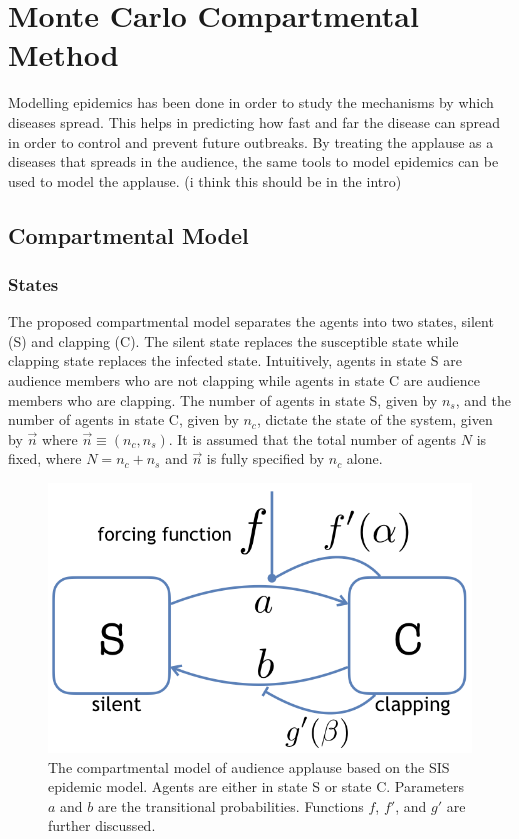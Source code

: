 \chapter{Monte Carlo Compartmental Method}
\label{chap2}

\hspace{\parindent} Modelling epidemics has been done in order to study the mechanisms by which diseases spread. This helps in predicting how fast and far the disease can spread in order to control and prevent future outbreaks. By treating the applause as a diseases that spreads in the audience, the same tools to model epidemics can be used to model the applause. (i think this should be in the intro)

\section{Compartmental Model}
\subsection{States}

The proposed compartmental model separates the agents into two states, silent (S) and clapping (C). The silent state replaces the susceptible state while clapping state replaces the infected state. 
Intuitively, agents in state S are audience members who are not clapping while agents in state C are audience members who are clapping.
The number of agents in state S, given by $n_{s}$, and the number of agents in state C, given by $n_{c}$, dictate the state of the system, given by $\vec{n}$ where $\vec{n}\equiv(n_{c},n_{s})$.
It is assumed that the total number of agents $N$ is fixed, where $N = n_{c} + n_{s}$ and $\vec{n}$ is fully specified by $n_{c}$ alone.

\begin{figure}
 \centering
  \includegraphics[width=0.5\linewidth]{images/chapter2/model2.png}
  \caption{The compartmental model of audience applause based on the SIS epidemic model. Agents are either in state S or state C. Parameters $a$ and $b$ are the transitional probabilities. Functions $f$, $f'$, and $g'$ are further discussed.}
  \label{fig:SCSmodel}
\end{figure}

